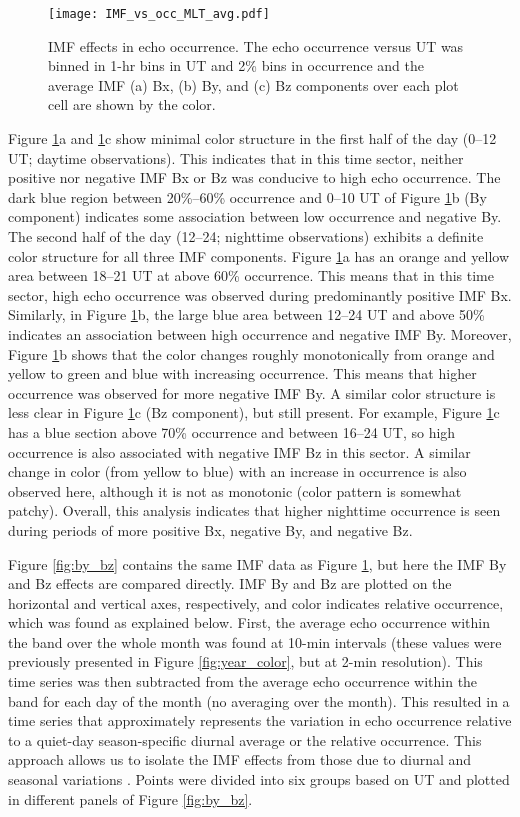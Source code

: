 \begin{figure}
\texttt{[image: IMF\_vs\_occ\_MLT\_avg.pdf]}
\caption{IMF effects in echo occurrence. The echo occurrence versus UT was binned in 1-hr bins in UT and 2\% bins in occurrence and the average IMF (a) Bx, (b) By, and (c) Bz components over each plot cell are shown by the color.}
\label{fig:ut_occ}
\end{figure}

Figure \ref{fig:ut_occ}a and \ref{fig:ut_occ}c show minimal color structure in the first half of the day (0--12 UT; daytime observations). This indicates that in this time sector, neither positive nor negative IMF Bx or Bz was conducive to high echo occurrence. The dark blue region between 20\%--60\% occurrence and 0--10 UT of Figure \ref{fig:ut_occ}b (By component) indicates some association between low occurrence and negative By. The second half of the day (12--24; nighttime observations) exhibits a definite color structure for all three IMF components. Figure \ref{fig:ut_occ}a has an orange and yellow area between 18--21 UT at above 60\% occurrence. This means that in this time sector, high echo occurrence was observed during predominantly positive IMF Bx. Similarly, in Figure \ref{fig:ut_occ}b, the large blue area between 12--24 UT and above 50\% indicates an association between high occurrence and negative IMF By. Moreover, Figure \ref{fig:ut_occ}b shows that the color changes roughly monotonically from orange and yellow to green and blue with increasing occurrence. This means that higher occurrence was observed for more negative IMF By. A similar color structure is less clear in Figure \ref{fig:ut_occ}c (Bz  component), but still present. For example, Figure \ref{fig:ut_occ}c has a blue section above 70\% occurrence and between 16--24 UT, so high occurrence is also associated with negative IMF Bz in this sector. A similar change in color (from yellow to blue) with an increase in occurrence is also observed here, although it is not as monotonic (color pattern is somewhat patchy). Overall, this analysis indicates that higher nighttime occurrence is seen during periods of more positive Bx, negative By, and negative Bz.

Figure \ref{fig:by_bz} contains the same IMF data as Figure \ref{fig:ut_occ}, but here the IMF By and Bz effects are compared directly. IMF By and Bz are plotted on the horizontal and vertical axes, respectively, and color indicates relative occurrence, which was found as explained below. First, the average echo occurrence within the band over the whole month was found at 10-min intervals (these values were previously presented in Figure \ref{fig:year_color}, but at 2-min resolution). This time series was then subtracted from the average echo occurrence within the band for each day of the month (no averaging over the month). This resulted in a time series that approximately represents the variation in echo occurrence relative to a quiet-day season-specific diurnal average or the relative occurrence. This approach allows us to isolate the IMF effects from those due to diurnal and seasonal variations \citep{Makarevich12}. Points were divided into six groups based on UT and plotted in different panels of Figure \ref{fig:by_bz}.

